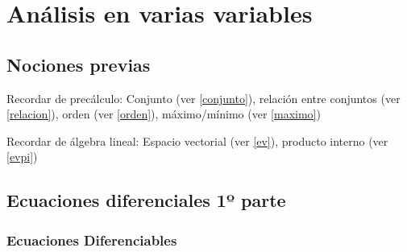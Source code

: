 %
%
%

\part{Análisis en varias variables}

\chapter{Nociones previas}

Recordar de precálculo:  Conjunto (ver \ref{conjunto}), relación entre conjuntos (ver \ref{relacion}), orden (ver \ref{orden}), máximo/mínimo (ver \ref{maximo})

Recordar de álgebra lineal:  Espacio vectorial (ver \ref{ev}), producto interno (ver \ref{evpi})




\chapter{Ecuaciones diferenciales 1º parte}

\section{Ecuaciones Diferenciables}

